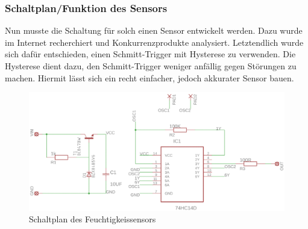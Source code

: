 \subsubsection{Schaltplan/Funktion des Sensors}
Nun musste die Schaltung für solch einen Sensor entwickelt werden. Dazu wurde im Internet
recherchiert und Konkurrenzprodukte analysiert. Letztendlich wurde sich dafür entschieden,
einen Schmitt-Trigger mit Hysterese zu verwenden. Die Hysterese dient dazu, den Schmitt-Trigger
weniger anfällig gegen Störungen zu machen. Hiermit lässt sich ein recht einfacher,
jedoch akkurater Sensor bauen.
\begin{figure}[ht]
    \includegraphics[width=\textwidth]{dennis/schaltplan}
    \caption{Schaltplan des Feuchtigkeissensors}
\end{figure}

